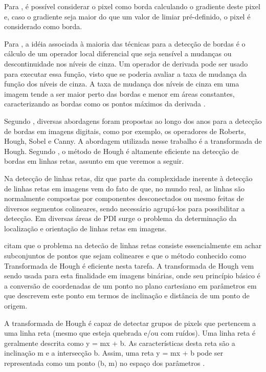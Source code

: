 Para , é possível considerar o pixel como borda calculando o gradiente deste pixel e, caso o gradiente seja maior do que um valor de limiar pré-definido, o pixel é considerado como borda. 

Para , a idéia associada à maioria das técnicas para a detecção de bordas é o cálculo de um operador local diferencial que seja sensível a mudanças ou descontinuidade nos níveis de cinza. Um operador de derivada pode ser usado para executar essa função, visto que se poderia avaliar a taxa de mudança da função dos níveis de cinza. A taxa de mudança dos níveis de cinza em uma imagem tende a ser maior perto das bordas e menor em áreas constantes, caracterizando as bordas como os pontos máximos da derivada \cite{PEDRINI2008}.

Segundo , diversas abordagens foram propostas ao longo dos anos para a detecção de bordas em imagens digitais, como por exemplo, os operadores de Roberts, Hough, Sobel e Canny. A abordagem utilizada nesse trabalho é a transformada de Hough. Segundo , o método de Hough é altamente eficiente na detecção de bordas em linhas retas, assunto em que veremos a seguir.

Na detecção de linhas retas,  diz que parte da complexidade inerente à detecção de linhas retas em imagens vem do fato de que, no mundo real, as linhas são normalmente compostas por componentes desconectados ou mesmo feitas de diversos segmentos colineares, sendo necessário agrupá-los para possibilitar a detecção. Em diversas áreas de PDI surge o problema da determinação da localização e orientação de linhas retas em imagens.

 citam que o problema na detecão de linhas retas consiste essencialmente em achar subconjuntos de pontos que sejam colineares e que o método conhecido como Transformada de Hough é eficiente nesta tarefa. A transformada de Hough vem sendo usada para esta finalidade em imagens binárias, onde seu princípio básico é a conversão de coordenadas de um ponto no plano cartesiano em parâmetros em que descrevem este ponto em termos de inclinação e distância de um ponto de origem.


A transformada de Hough é capaz de detectar grupos de pixels que pertencem a uma linha reta (mesmo que esteja quebrada e/ou com ruídos). Uma linha reta é geralmente descrita como y = mx + b. As características desta reta são a inclinação m e a intersecção b. Assim, uma reta y = mx + b pode ser representada como um ponto (b, m) no espaço dos parâmetros \cite{HOUGHKIM}. 

